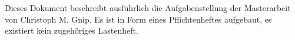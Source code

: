 Dieses Dokument beschreibt ausführlich die Aufgabenstellung der Masterarbeit von Christoph M. Gnip. Es ist in Form eines Pflichtenheftes aufgebaut, es existiert kein zugehöriges Lastenheft. 